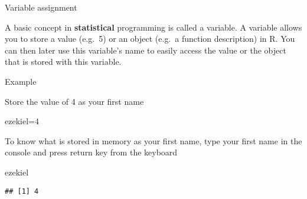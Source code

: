 \documentclass[ignorenonframetext,]{beamer}
\newenvironment{Shaded}{\begin{snugshade}}{\end{snugshade}}
\newcommand{\DecValTok}[1]{\textcolor[rgb]{0.00,0.00,0.81}{#1}}
\newcommand{\NormalTok}[1]{#1}
\begin{document}
\begin{frame}[fragile]{Variable assignment}

A basic concept in \textbf{statistical} programming is called a
variable. A variable allows you to store a value (e.g.~5) or an object
(e.g.~a function description) in R. You can then later use this
variable's name to easily access the value or the object that is stored
with this variable.

\begin{block}{Example}

Store the value of 4 as your first name

\begin{Shaded}
\begin{Highlighting}[]
\NormalTok{ezekiel=}\DecValTok{4}
\end{Highlighting}
\end{Shaded}

To know what is stored in memory as your first name, type your first
name in the console and press return key from the keyboard

\begin{Shaded}
\begin{Highlighting}[]
\NormalTok{ezekiel}
\end{Highlighting}
\end{Shaded}

\begin{verbatim}
## [1] 4
\end{verbatim}

\end{block}

\end{frame}
\end{document}
